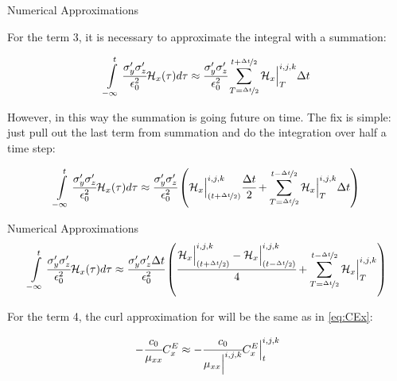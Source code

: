 \documentclass[aspectratio=169]{beamer}
\begin{document}
\begin{frame}{Numerical Approximations}
  
  For the term 3, it is necessary to approximate the integral with a summation:

  \begin{align}
      \int\limits_{-\infty}^t\cfrac{\sigma_y^{\prime}\sigma_z^{\prime}}{\epsilon_0^2}\mathcal{H}_x(\tau)d\tau \approx \cfrac{\sigma_y^{\prime}\sigma_z^{\prime}}{\epsilon_0^2} \sum_{T=\nicefrac{\Delta t}{2}}^{t + \nicefrac{\Delta t}{2}}\mathcal{H}_x\Big|^{i,j,k}_{T}\Delta t
  \end{align}
  
  However, in this way the summation is going future on time. The fix is simple: just pull out the last term from summation and do the integration over half a time step:
  
  \begin{align}
      \int\limits_{-\infty}^t\cfrac{\sigma_y^{\prime}\sigma_z^{\prime}}{\epsilon_0^2}\mathcal{H}_x(\tau)d\tau \nonumber \approx \cfrac{\sigma_y^{\prime}\sigma_z^{\prime}}{\epsilon_0^2} \left( \mathcal{H}_x\Big|_{(t+\nicefrac{\Delta t}{2})}^{i,j,k} \cfrac{\Delta t}{2} + \sum\limits_{T=\nicefrac{\Delta t}{2}}^{t - \nicefrac{\Delta t}{2}}\mathcal{H}_x\Big|^{i,j,k}_{T}\Delta t \right)
  \end{align}
  
\end{frame}

\begin{frame}{Numerical Approximations}
  \begin{align}
    \int\limits_{-\infty}^t\cfrac{\sigma_y^{\prime}\sigma_z^{\prime}}{\epsilon_0^2}\mathcal{H}_x(\tau)d\tau \approx\cfrac{\sigma_y^{\prime}\sigma_z^{\prime}\Delta t}{\epsilon_0^2} \left( \cfrac{\mathcal{H}_x\Big|_{(t+\nicefrac{\Delta t}{2})}^{i,j,k}-\mathcal{H}_x\Big|^{i,j,k}_{(t-\nicefrac{\Delta t}{2})}}{4} + \sum\limits_{T=\nicefrac{\Delta t}{2}}^{t - \nicefrac{\Delta t}{2}}\mathcal{H}_x\Big|^{i,j,k}_{T} \right)
  \end{align}

  For the term 4, the curl approximation for will be the same as in \eqref{eq:CEx}:
  
  \begin{align}
      -\cfrac{c_0}{\mu_{xx}}C_x^E \approx -\cfrac{c_0}{\mu_{xx}\Big|^{i,j,k}}C_x^E\Big|^{i,j,k}_{t}
  \end{align}

\end{frame}
\end{document}
